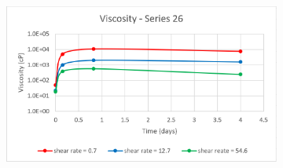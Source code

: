 \begin{appendices}
\begin{figure}
{\begin{subfigure}[b]{0.6\textwidth}
     \end{subfigure}
     \begin{subfigure}[b]{0.6\textwidth}
         \centering
         \includegraphics[width=\textwidth]{img/visc/26.png}
     \end{subfigure}
    }\\
\end{figure}
\end{appendices}
